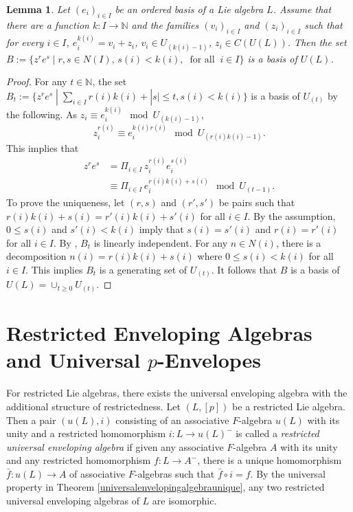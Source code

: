 \documentclass[12pt,MSc]{muthesis_2023}
\theoremstyle{plain}%
\newtheorem{Lemma}[FactCounter]{Lemma} %
\theoremstyle{definition}
\theoremstyle{remark}
\begin{document}
\begin{Lemma}\label{basisofU(L)}
Let $(e_i)_{i\in I}$ be an ordered basis of a Lie algebra $L$. Assume that there are a function $k: I \rightarrow \mathbb{N}$ and the families $(v_i)_{i\in I}$ and $(z_i)_{i\in I}$ such that for every $i\in I$, $e_i^{k(i)}=v_i+z_i$, $v_i\in U_{(k(i)-1)}$, $z_i\in C(U(L))$. Then the set $B := \{z^re^s\;|\; r,s\in N(I), \,s(i)<k(i),\;\; \text{for all}\;\; i\in I\}$ is a basis of $U(L)$.
\end{Lemma}

\begin{proof}
For any $t\in \mathbb{N}$, the set $B_t:=\{z^re^s \;|\; \sum_{i\in I}r(i)k(i)+|s| \leq t, s(i)<k(i)\}$ is a basis of $U_{(t)}$ by the following. As $z_i \equiv e_i^{k(i)} \mod U_{(k(i)-1)}$,
$$z_i^{r(i)}\equiv e_i^{k(i)r(i)}\mod U_{(r(i)k(i)-1)}.$$
This implies that
\begin{align*}
z^re^s&=\Pi_{i\in I}\,z_i^{r(i)}e_i^{s(i)}\\
&\equiv \Pi_{i\in I}\,e_i^{r(i)k(i)+s(i)} \mod U_{(t-1)}.
\end{align*}
To prove the uniqueness, let $(r,s)$ and $(r',s')$ be pairs such that $r(i)k(i)+s(i)=r'(i)k(i)+s'(i)$ for all $i\in I$. By the assumption, $0 \leq s(i)$ and $s'(i)<k(i)$ imply that $s(i)=s'(i)$ and $r(i)=r'(i)$ for all $i\in I$. By   , $B_t$ is linearly independent. For any $n\in N(i)$, there is a decomposition $n(i)=r(i)k(i)+s(i)$ where $0\leq s(i)<k(i)$ for all $i\in I$. This implies $B_t$ is a generating set of $U_{(t)}$. It follows that $B$ is a basis of $U(L)=\cup_{t\geq0}U_{(t)}$.

\end{proof}

\section{Restricted Enveloping Algebras and Universal $p$-Envelopes}
For restricted Lie algebras, there exists the universal enveloping algebra with the additional structure of restrictedness. Let $(L,[p])$ be a restricted Lie algebra. Then a pair $(u(L),i)$ consisting of an associative $F$-algebra $u(L)$ with its unity and a restricted homomorphism $i: L \rightarrow u(L)^-$ is called a \textit{restricted universal enveloping algebra} if given any associative $F$-algebra $A$ with its unity and any restricted homomorphism $f:L\rightarrow A^-$, there is a unique homomorphism $\bar{f}: u(L) \rightarrow A$ of associative $F$-algebras such that $\bar{f}\circ i=f$. By the universal property in Theorem \ref{universalenvelopingalgebraunique}, any two restricted universal enveloping algebras of $L$ are isomorphic.
\end{document}

